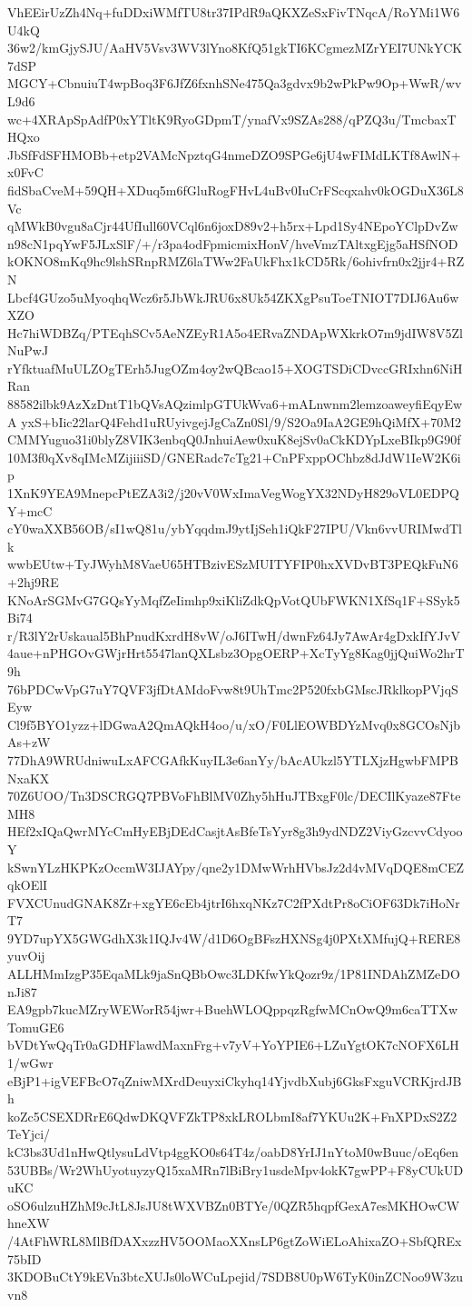 VhEEirUzZh4Nq+fuDDxiWMfTU8tr37IPdR9aQKXZeSxFivTNqcA/RoYMi1W6U4kQ
36w2/kmGjySJU/AaHV5Vsv3WV3lYno8KfQ51gkTI6KCgmezMZrYEI7UNkYCK7dSP
MGCY+CbnuiuT4wpBoq3F6JfZ6fxnhSNe475Qa3gdvx9b2wPkPw9Op+WwR/wvL9d6
wc+4XRApSpAdfP0xYTltK9RyoGDpmT/ynafVx9SZAs288/qPZQ3u/TmcbaxTHQxo
JbSfFdSFHMOBb+etp2VAMcNpztqG4nmeDZO9SPGe6jU4wFIMdLKTf8AwlN+x0FvC
fidSbaCveM+59QH+XDuq5m6fGluRogFHvL4uBv0IuCrFScqxahv0kOGDuX36L8Vc
qMWkB0vgu8aCjr44UfIull60VCql6n6joxD89v2+h5rx+Lpd1Sy4NEpoYClpDvZw
n98cN1pqYwF5JLxSlF/+/r3pa4odFpmicmixHonV/hveVmzTAltxgEjg5aHSfNOD
kOKNO8mKq9hc9lshSRnpRMZ6laTWw2FaUkFhx1kCD5Rk/6ohivfrn0x2jjr4+RZN
Lbcf4GUzo5uMyoqhqWcz6r5JbWkJRU6x8Uk54ZKXgPsuToeTNIOT7DIJ6Au6wXZO
Hc7hiWDBZq/PTEqhSCv5AeNZEyR1A5o4ERvaZNDApWXkrkO7m9jdIW8V5ZlNuPwJ
rYfktuafMuULZOgTErh5JugOZm4oy2wQBcao15+XOGTSDiCDvccGRIxhn6NiHRan
88582ilbk9AzXzDntT1bQVsAQzimlpGTUkWva6+mALnwnm2lemzoaweyfiEqyEwA
yxS+bIic22larQ4Fehd1uRUyivgejJgCaZn0Sl/9/S2Oa9IaA2GE9hQiMfX+70M2
CMMYuguo31i0blyZ8VIK3enbqQ0JnhuiAew0xuK8ejSv0aCkKDYpLxeBIkp9G90f
10M3f0qXv8qIMcMZijiiiSD/GNERadc7cTg21+CnPFxppOChbz8dJdW1IeW2K6ip
1XnK9YEA9MnepcPtEZA3i2/j20vV0WxImaVegWogYX32NDyH829oVL0EDPQY+mcC
cY0waXXB56OB/sI1wQ81u/ybYqqdmJ9ytIjSeh1iQkF27IPU/Vkn6vvURIMwdTlk
wwbEUtw+TyJWyhM8VaeU65HTBzivESzMUITYFIP0hxXVDvBT3PEQkFuN6+2hj9RE
KNoArSGMvG7GQsYyMqfZeIimhp9xiKliZdkQpVotQUbFWKN1XfSq1F+SSyk5Bi74
r/R3lY2rUskaual5BhPnudKxrdH8vW/oJ6ITwH/dwnFz64Jy7AwAr4gDxkIfYJvV
4aue+nPHGOvGWjrHrt5547lanQXLsbz3OpgOERP+XcTyYg8Kag0jjQuiWo2hrT9h
76bPDCwVpG7uY7QVF3jfDtAMdoFvw8t9UhTmc2P520fxbGMscJRklkopPVjqSEyw
Cl9f5BYO1yzz+lDGwaA2QmAQkH4oo/u/xO/F0LlEOWBDYzMvq0x8GCOsNjbAs+zW
77DhA9WRUdniwuLxAFCGAfkKuyIL3e6anYy/bAcAUkzl5YTLXjzHgwbFMPBNxaKX
70Z6UOO/Tn3DSCRGQ7PBVoFhBlMV0Zhy5hHuJTBxgF0lc/DECIlKyaze87FteMH8
HEf2xIQaQwrMYcCmHyEBjDEdCasjtAsBfeTsYyr8g3h9ydNDZ2ViyGzcvvCdyooY
kSwnYLzHKPKzOccmW3IJAYpy/qne2y1DMwWrhHVbsJz2d4vMVqDQE8mCEZqkOElI
FVXCUnudGNAK8Zr+xgYE6cEb4jtrI6hxqNKz7C2fPXdtPr8oCiOF63Dk7iHoNrT7
9YD7upYX5GWGdhX3k1IQJv4W/d1D6OgBFszHXNSg4j0PXtXMfujQ+RERE8yuvOij
ALLHMmIzgP35EqaMLk9jaSnQBbOwc3LDKfwYkQozr9z/1P81INDAhZMZeDOnJi87
EA9gpb7kucMZryWEWorR54jwr+BuehWLOQppqzRgfwMCnOwQ9m6caTTXwTomuGE6
bVDtYwQqTr0aGDHFlawdMaxnFrg+v7yV+YoYPIE6+LZuYgtOK7cNOFX6LH1/wGwr
eBjP1+igVEFBcO7qZniwMXrdDeuyxiCkyhq14YjvdbXubj6GksFxguVCRKjrdJBh
koZc5CSEXDRrE6QdwDKQVFZkTP8xkLROLbmI8af7YKUu2K+FnXPDxS2Z2TeYjci/
kC3bs3Ud1nHwQtlysuLdVtp4ggKO0s64T4z/oabD8YrIJ1nYtoM0wBuuc/oEq6en
53UBBs/Wr2WhUyotuyzyQ15xaMRn7lBiBry1usdeMpv4okK7gwPP+F8yCUkUDuKC
oSO6ulzuHZhM9cJtL8JsJU8tWXVBZn0BTYe/0QZR5hqpfGexA7esMKHOwCWhneXW
/4AtFhWRL8MlBfDAXxzzHV5OOMaoXXnsLP6gtZoWiELoAhixaZO+SbfQREx75bID
3KDOBuCtY9kEVn3btcXUJs0loWCuLpejid/7SDB8U0pW6TyK0inZCNoo9W3zuvn8
